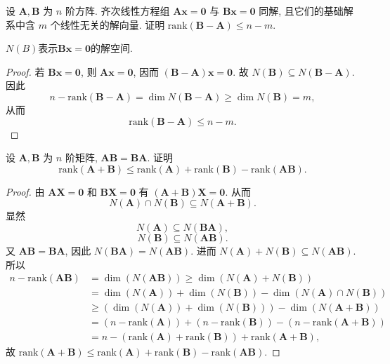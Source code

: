 \documentclass[../../main.tex]{subfiles}
\begin{document}
\begin{example}
设 $\boldsymbol{A},\boldsymbol{B}$ 为 $n$ 阶方阵. 齐次线性方程组 $\boldsymbol{A}\boldsymbol{x} = \boldsymbol{0}$ 与 $\boldsymbol{B}\boldsymbol{x} = \boldsymbol{0}$ 同解, 且它们的基础解系中含 $m$ 个线性无关的解向量. 证明 $\mathrm{rank}(\boldsymbol{B} - \boldsymbol{A}) \leqslant n - m$.
\end{example}
\begin{remark}
$N(B)$表示$\boldsymbol{B}\boldsymbol{x} = \boldsymbol{0}$的解空间.
\end{remark}
\begin{proof}
若 $\boldsymbol{B}\boldsymbol{x} = \boldsymbol{0}$, 则 $\boldsymbol{A}\boldsymbol{x} = \boldsymbol{0}$, 因而 $(\boldsymbol{B} - \boldsymbol{A})\boldsymbol{x} = \boldsymbol{0}$. 故 $N(\boldsymbol{B}) \subseteq N(\boldsymbol{B} - \boldsymbol{A})$. 因此
\[
n - \mathrm{rank}(\boldsymbol{B} - \boldsymbol{A}) = \dim N(\boldsymbol{B} - \boldsymbol{A}) \geqslant \dim N(\boldsymbol{B}) = m,
\]
从而
\[
\mathrm{rank}(\boldsymbol{B} - \boldsymbol{A}) \leqslant n - m.
\]
\end{proof}

\begin{example}
设 $\boldsymbol{A},\boldsymbol{B}$ 为 $n$ 阶矩阵, $\boldsymbol{AB} = \boldsymbol{BA}$. 证明
\[
\mathrm{rank}(\boldsymbol{A} + \boldsymbol{B}) \leqslant \mathrm{rank}(\boldsymbol{A}) + \mathrm{rank}(\boldsymbol{B}) - \mathrm{rank}(\boldsymbol{AB}).
\]
\end{example}
\begin{proof}
由 $\boldsymbol{A}\boldsymbol{X} = \boldsymbol{0}$ 和 $\boldsymbol{B}\boldsymbol{X} = \boldsymbol{0}$ 有 $(\boldsymbol{A} + \boldsymbol{B})\boldsymbol{X} = \boldsymbol{0}$. 从而
\[
N(\boldsymbol{A}) \cap N(\boldsymbol{B}) \subseteq N(\boldsymbol{A} + \boldsymbol{B}).
\]
显然
\[
N(\boldsymbol{A}) \subseteq N(\boldsymbol{BA}),
\]
\[
N(\boldsymbol{B}) \subseteq N(\boldsymbol{AB}).
\]
又 $\boldsymbol{AB} = \boldsymbol{BA}$, 因此 $N(\boldsymbol{BA}) = N(\boldsymbol{AB})$. 进而 $N(\boldsymbol{A}) + N(\boldsymbol{B}) \subseteq N(\boldsymbol{AB})$. 所以
\begin{align*}
n - \mathrm{rank}(\boldsymbol{AB}) &= \dim (N(\boldsymbol{AB})) \geqslant \dim (N(\boldsymbol{A}) + N(\boldsymbol{B})) \\
&= \dim (N(\boldsymbol{A})) + \dim (N(\boldsymbol{B})) - \dim (N(\boldsymbol{A}) \cap N(\boldsymbol{B})) \\
&\geqslant (\dim (N(\boldsymbol{A})) + \dim (N(\boldsymbol{B}))) - \dim (N(\boldsymbol{A} + \boldsymbol{B})) \\
&= (n - \mathrm{rank}(\boldsymbol{A})) + (n - \mathrm{rank}(\boldsymbol{B})) - (n - \mathrm{rank}(\boldsymbol{A} + \boldsymbol{B})) \\
&= n - (\mathrm{rank}(\boldsymbol{A}) + \mathrm{rank}(\boldsymbol{B})) + \mathrm{rank}(\boldsymbol{A} + \boldsymbol{B}),
\end{align*}
故 $\mathrm{rank}(\boldsymbol{A} + \boldsymbol{B}) \leqslant \mathrm{rank}(\boldsymbol{A}) + \mathrm{rank}(\boldsymbol{B}) - \mathrm{rank}(\boldsymbol{AB})$.
\end{proof}
\end{document}
